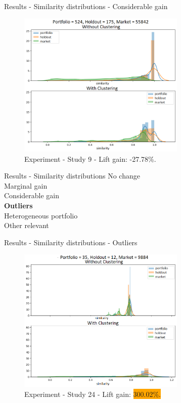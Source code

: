 
\begin{frame}{Results - Similarity distributions - Considerable gain}
    \begin{figure}
       \centering
       \includegraphics[width=8cm]{fig/ch4-study-9-considerable-decrease-exp-1.png}
       \caption{Experiment \nameExperimentI{} - Study 9 - Lift gain: \colorbox{dred}{-27.78\%.}}
    \end{figure}
\end{frame}


\begin{frame}{Results - Similarity distributions}
    No change \\ 
    \vspace{0.5cm}
    Marginal gain \\
    \vspace{0.5cm}
    Considerable gain \\
    \vspace{0.5cm}
    \textbf{Outliers} \\
    \vspace{0.5cm}
    Heterogeneous portfolio \\
    \vspace{0.5cm}
    Other relevant 
\end{frame}


\begin{frame}{Results - Similarity distributions - Outliers}
    \begin{figure}
       \centering
       \includegraphics[width=8cm]{fig/ch4-outlier-study-24-exp-2.png}
       \caption{Experiment \nameExperimentII{} - Study 24 - Lift gain: \colorbox{orange}{300.02\%.}}
    \end{figure}
\end{frame}

